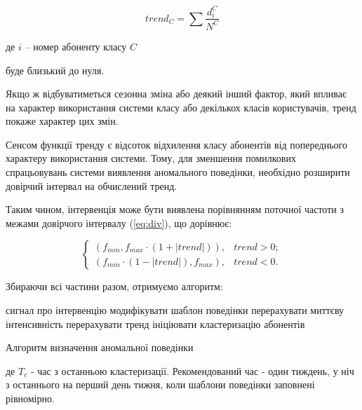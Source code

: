 \begin{equation}\label{eq:trend} trend_{C} = \sum{\frac{d_i^C}{N^C}} \end{equation}
\begin{ESKDexplanation}
  \item де $i$ -- номер абоненту класу $C$
\end{ESKDexplanation}

буде близький до нуля.

Якщо ж відбуватиметься сезонна зміна або деякий інший фактор, який впливає на характер використання системи класу або декількох класів користувачів, тренд покаже характер цих змін.

Сенсом функції тренду є відсоток відхилення класу абонентів від попереднього характеру використання системи. Тому, для зменшення помилкових спрацьовувань системи виявлення аномального поведінки, необхідно розширити довірчий інтервал на обчислений тренд.

Таким чином, інтервенція може бути виявлена порівнянням поточної частоти з межами довірчого інтервалу (\ref{eq:div}), що дорівнює:

\begin{equation}\label{eq:conf_interval_w_trend} 
  \begin{cases}
    (f_{min}, f_{max} \cdot (1 + |trend|)), & trend > 0;\\
    (f_{min} \cdot (1 - |trend|), f_{max}), & trend < 0.
  \end{cases}
\end{equation} %

Збираючи всі частини разом, отримуємо алгоритм:

\begin{algorithm}[H]

   {
     {
       {
        сигнал про інтервенцію\;
       }
    }
   модифікувати шаблон поведінки\;
   перерахувати миттєву інтенсивність\;
   перерахувати тренд\;
    {
    ініціювати кластеризацію абонентів\;
   }
  }
\caption{Алгоритм визначення аномальної поведінки}
\label{alg:general_anomaly_detection}
\end{algorithm}

\begin{ESKDexplanation}
  \item де $T_{c}$ - час з останньою кластеризації. Рекомендований час - один тиждень, у ніч з останнього на перший день тижня, коли шаблони поведінки заповнені рівномірно.
\end{ESKDexplanation}

